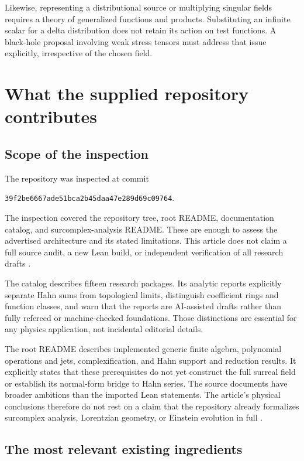 \documentclass[11pt,letterpaper]{article}
\theoremstyle{definition}
\theoremstyle{remark}
\begin{document}
Likewise, representing a distributional source or multiplying singular fields
requires a theory of generalized functions and products. Substituting an
infinite scalar for a delta distribution does not retain its action on test
functions. A black-hole proposal involving weak stress tensors must address
that issue explicitly, irrespective of the chosen field.

\section{What the supplied repository contributes}
\label{sec:repo}

\subsection{Scope of the inspection}

The repository was inspected at commit
\begin{center}
\small\texttt{39f2be6667ade51bca2b45daa47e289d69c09764}.
\end{center}
The inspection covered the repository tree, root README, documentation catalog,
and surcomplex-analysis README. These are enough to assess the advertised
architecture and its stated limitations. This article does not claim a full
source audit, a new Lean build, or independent verification of all research
drafts \cite{RepoRoot,RepoDocs,RepoAnalysis}.

The catalog describes fifteen research packages. Its analytic reports
explicitly separate Hahn sums from topological limits, distinguish coefficient
rings and function classes, and warn that the reports are AI-assisted drafts
rather than fully refereed or machine-checked foundations. Those distinctions
are essential for any physics application, not incidental editorial details.

The root README describes implemented generic finite algebra, polynomial
operations and jets, complexification, and Hahn support and reduction results.
It explicitly states that these prerequisites do not yet construct the full
surreal field or establish its normal-form bridge to Hahn series. The source
documents have broader ambitions than the imported Lean statements. The
article's physical conclusions therefore do not rest on a claim that the
repository already formalizes surcomplex analysis, Lorentzian geometry, or
Einstein evolution in full \cite{RepoRoot}.

\subsection{The most relevant existing ingredients}
\end{document}
